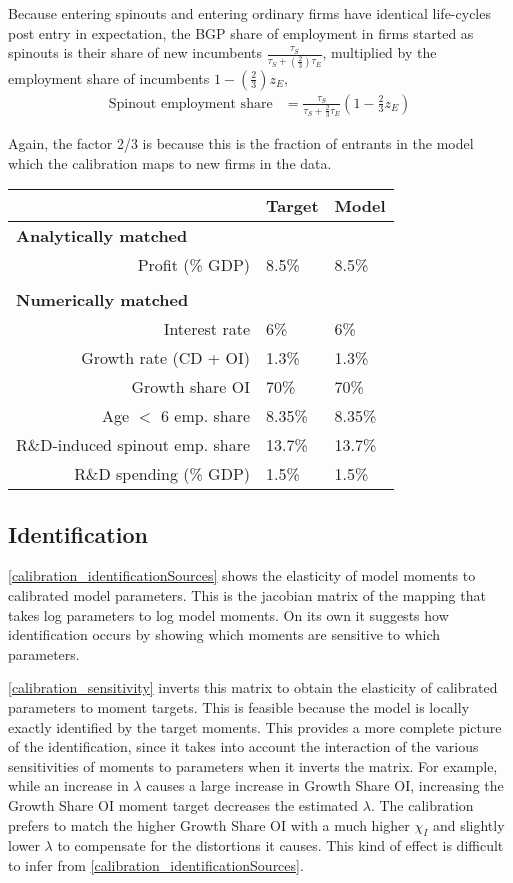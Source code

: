 \documentclass[11pt,english]{article}
\theoremstyle{remark}
\begin{document}
Because entering spinouts and entering ordinary firms have identical life-cycles post entry in expectation, the BGP share of employment in firms started as spinouts is their share of new incumbents $\frac{\tau_S}{\tau_S+ (\frac{2}{3})\tau_E}$, multiplied by the employment share of incumbents $1- (\frac{2}{3})z_E$, 
\begin{align*}
	\textrm{Spinout employment share} &= \frac{\tau_S}{\tau_S + \frac{2}{3}\tau_E} (1 - \frac{2}{3}z_E) 
\end{align*}

Again, the factor 2/3 is because this is the fraction of entrants in the model which the calibration maps to new firms in the data.


\begin{table}[]
	\centering
	\label{calibration_targets}
	\begin{tabular}{rll}
		\toprule \toprule
		& Target & Model \tabularnewline
		\midrule
		\multicolumn{1}{l}{\textbf{Analytically matched}} & & 
		\tabularnewline
		Profit (\% GDP) & 8.5\% & 8.5\% 
		\tabularnewline
		\tabularnewline
		\multicolumn{1}{l}{\textbf{Numerically matched}} & & 
		\tabularnewline
		Interest rate & 6\% & 6\% 
		\tabularnewline
		Growth rate (CD + OI) & 1.3\% & 1.3\%
		\tabularnewline		
		Growth share OI & 70\% & 70\%
		\tabularnewline
		Age $<$ 6 emp. share  & 8.35\% & 8.35\%
		\tabularnewline
		R\&D-induced spinout emp. share & 13.7\% & 13.7\%
		\tabularnewline
		R\&D spending (\% GDP) & 1.5\% & 1.5\%
		\tabularnewline
		\bottomrule
	\end{tabular}
\end{table}

\normalsize

\subsection{Identification}

\autoref{calibration_identificationSources} shows the elasticity of model moments to calibrated model parameters. This is the jacobian matrix of the mapping that takes log parameters to log model moments. On its own it suggests how identification occurs by showing which moments are sensitive to which parameters. 

\autoref{calibration_sensitivity} inverts this matrix to obtain the elasticity of calibrated parameters to moment targets. This is feasible because the model is locally exactly identified by the target moments. This provides a more complete picture of the identification, since it takes into account the interaction of the various sensitivities of moments to parameters when it inverts the matrix. For example, while an increase in $\lambda$ causes a large increase in Growth Share OI, increasing the Growth Share OI moment target decreases the estimated $\lambda$. The calibration prefers to match the higher Growth Share OI with a much higher $\chi_I$ and slightly lower $\lambda$ to compensate for the distortions it causes. This kind of effect is difficult to infer from \autoref{calibration_identificationSources}. 
\end{document}

